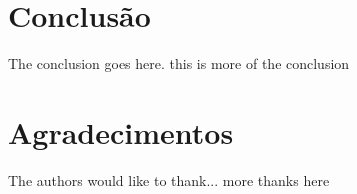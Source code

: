\section{Conclusão}
The conclusion goes here. this is more of the conclusion


\section*{Agradecimentos}
The authors would like to thank...
more thanks here